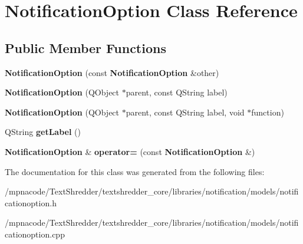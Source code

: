 \section{NotificationOption Class Reference}
\label{class_notification_option}
\subsection*{Public Member Functions}
\begin{DoxyCompactItemize}
\item 
{\bfseries NotificationOption} (const {\bf NotificationOption} \&other)\label{class_notification_option_a2571dcd1abd6fbd2836b4192424d6a2d}

\item 
{\bfseries NotificationOption} (QObject $\ast$parent, const QString label)\label{class_notification_option_abf18d3563d00e2af4f39b24b2a4e4013}

\item 
{\bfseries NotificationOption} (QObject $\ast$parent, const QString label, void $\ast$function)\label{class_notification_option_aca9f0afd0cd059391f3279afc35c5d25}

\item 
QString {\bfseries getLabel} ()\label{class_notification_option_a03f2aca78b36d33234e51506fcf72405}

\item 
{\bf NotificationOption} \& {\bfseries operator=} (const {\bf NotificationOption} \&)\label{class_notification_option_abd149be083372e9a34671a95a3a869c1}

\end{DoxyCompactItemize}


The documentation for this class was generated from the following files:\begin{DoxyCompactItemize}
\item 
/mpnacode/TextShredder/textshredder\_\-core/libraries/notification/models/notificationoption.h\item 
/mpnacode/TextShredder/textshredder\_\-core/libraries/notification/models/notificationoption.cpp\end{DoxyCompactItemize}
